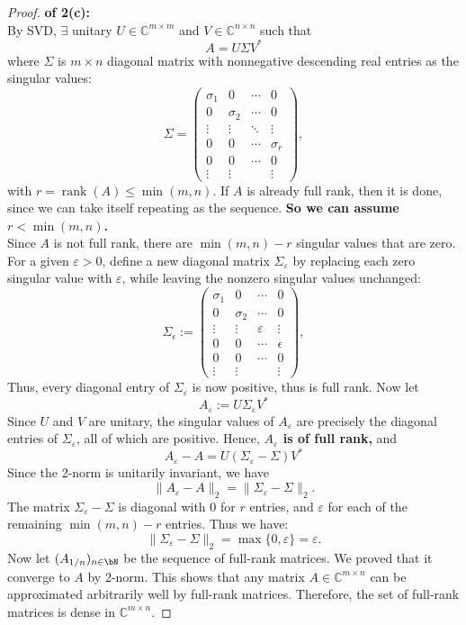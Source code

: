 \documentclass[lang=cn,11pt]{elegantbook}
\begin{document}
\begin{proof}
    \textbf{of 2(c):}\\
By SVD, $\exists$ unitary \( U \in \mathbb{C}^{m \times m} \) and \( V \in \mathbb{C}^{n \times n} \) such that
\[
A = U \Sigma V^*
\]
where \(\Sigma\) is \( m \times n \) diagonal matrix with nonnegative descending real entries as the singular values:
\[
\Sigma = \begin{pmatrix}
\sigma_1 & 0 & \cdots & 0 \\
0 & \sigma_2 & \cdots & 0 \\
\vdots & \vdots & \ddots & \vdots \\
0 & 0 & \cdots & \sigma_r \\
0 & 0 & \cdots & 0 \\
\vdots & \vdots & & \vdots
\end{pmatrix},
\]
with \( r = \operatorname{rank}(A) \le \min(m,n) \). If \( A \) is already full rank, then it is done, since we can take itself repeating as the sequence. \textbf{So we can assume \( r < \min(m,n) \).}\\
Since \( A \) is not full rank, there are \( \min(m,n) - r \) singular values that are zero. For a given \( \varepsilon > 0 \), define a new diagonal matrix \(\Sigma_\varepsilon\) by replacing each zero singular value with \(\varepsilon\), while leaving the nonzero singular values unchanged:
\[
\Sigma_\epsilon := \begin{pmatrix}
\sigma_1 & 0 & \cdots & 0 \\
0 & \sigma_2 & \cdots & 0 \\
\vdots & \vdots & \varepsilon & \vdots \\
0 & 0 & \cdots & \epsilon \\
0 & 0 & \cdots & 0 \\
\vdots & \vdots & & \vdots
\end{pmatrix},
\]
Thus, every diagonal entry of \(\Sigma_\varepsilon\) is now positive, thus is full rank. Now let 
$$
A_\varepsilon := U \Sigma_\varepsilon V^*
$$
Since \( U \) and \( V \) are unitary, the singular values of \( A_\varepsilon \) are precisely the diagonal entries of \( \Sigma_\varepsilon \), all of which are positive. Hence, \textbf{\( A_\varepsilon \) is of full rank,} and
\[
A_\varepsilon - A = U (\Sigma_\varepsilon - \Sigma) V^*
\]
Since the 2-norm is unitarily invariant, we have
\[
\|A_\varepsilon - A\|_2 = \|\Sigma_\varepsilon - \Sigma\|_2.
\]
The matrix \(\Sigma_\varepsilon - \Sigma\) is diagonal with \( 0 \) for \( r \) entries, and \( \varepsilon \) for each of the remaining \(\min(m,n) - r\) entries. Thus we have:
\[
\|\Sigma_\varepsilon - \Sigma\|_2 = \max\{ 0, \varepsilon \} = \varepsilon.
\]
Now let $(A_{1/n})_{n\in\bN}$ be the sequence of full-rank matrices. We proved that it converge to $A$ by 2-norm. This shows that any matrix \( A \in \mathbb{C}^{m \times n} \) can be approximated arbitrarily well by full-rank matrices. Therefore, the set of full-rank matrices is dense in \(\mathbb{C}^{m \times n}\).
\end{proof}
\end{document}
